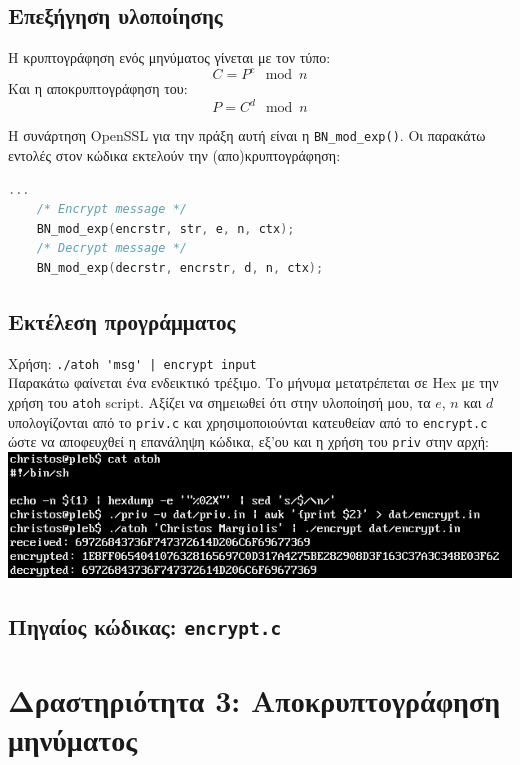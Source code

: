 \documentclass[12pt]{article}
\begin{document}
\subsection{Επεξήγηση υλοποίησης}

Η κρυπτογράφηση ενός μηνύματος γίνεται με τον τύπο:
\[C = P^e \mod n\]
Και η αποκρυπτογράφηση του:
\[P = C^d \mod n\]

Η συνάρτηση OpenSSL για την πράξη αυτή είναι η \lstinline{BN_mod_exp()}. Οι
παρακάτω εντολές στον κώδικα εκτελούν την (απο)κρυπτογράφηση: \\

\begin{lstlisting}[language=C]
	...
	/* Encrypt message */
	BN_mod_exp(encrstr, str, e, n, ctx);
	/* Decrypt message */
	BN_mod_exp(decrstr, encrstr, d, n, ctx);
\end{lstlisting}

\subsection{Εκτέλεση προγράμματος}

Χρήση: \lstinline{./atoh 'msg' | encrypt input} \\

Παρακάτω φαίνεται ένα ενδεικτικό τρέξιμο. Το μήνυμα μετατρέπεται σε Hex με την
χρήση του \lstinline{atoh} script. Αξίζει να σημειωθεί ότι στην υλοποίησή μου,
τα $e$, $n$ και $d$ υπολογίζονται από το \lstinline{priv.c} και
χρησιμοποιούνται κατευθείαν από το \lstinline{encrypt.c} ώστε να αποφευχθεί η
επανάληψη κώδικα, εξ'ου και η χρήση του \lstinline{priv} στην αρχή: \\

\includegraphics[width=\textwidth]{res/encrypt.png} \\

\subsection{Πηγαίος κώδικας: \lstinline{encrypt.c}}



\section{Δραστηριότητα 3: Αποκρυπτογράφηση μηνύματος}
\end{document}
